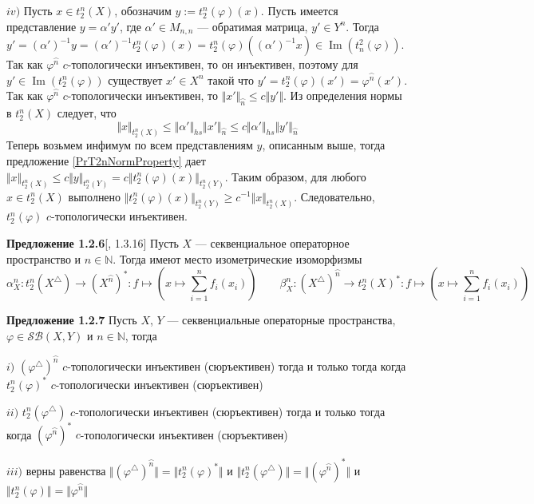 \documentclass[12pt]{article}
\begin{document}
$iv)$ Пусть $x\in t_2^n(X)$, обозначим $y:=t_2^n(\varphi)(x)$. Пусть имеется представление $y=\alpha' y'$, где $\alpha'\in M_{n,n}$ --- обратимая матрица, $y'\in Y^n$. Тогда 
$y'=(\alpha')^{-1}y=(\alpha')^{-1}t_2^n(\varphi)(x)=t_2^n(\varphi)((\alpha')^{-1}x)\in\operatorname{Im}(t_n^2(\varphi))
$. Так как $\varphi^{\wideparen{n}}$ $c$-топологически инъективен, то он инъективен, поэтому для $y'\in \operatorname{Im}(t_2^n(\varphi))$ существует $x'\in X^n$ такой что 
$y'=t_2^n(\varphi)(x')=\varphi^{\wideparen{n}}(x')$. Так как $\varphi^{\wideparen{n}}$ $c$-топологически инъективен, то $\Vert x'\Vert_{\wideparen{n}}\leq c\Vert y'\Vert$. Из определения нормы в $t_2^n(X)$ следует, что
$$
\Vert x\Vert_{t_2^n(X)}\leq\Vert\alpha'\Vert_{hs}\Vert x'\Vert_{\wideparen{n}}\leq c\Vert\alpha'\Vert_{hs}\Vert y'\Vert_{\wideparen{n}}
$$
Теперь возьмем инфимум по всем представлениям $y$, описанным выше, тогда предложение \ref{PrT2nNormProperty} дает $\Vert x\Vert_{t_2^n(X)}\leq c\Vert y\Vert_{t_2^n(Y)}=c\Vert t_2^n(\varphi)(x)\Vert_{t_2^n(Y)}$. 
Таким образом, для любого $x\in t_2^n(X)$ выполнено $\Vert t_2^n(\varphi)(x)\Vert_{t_2^n(Y)}\geq c^{-1}\Vert x\Vert_{t_2^n(X)}$. Следовательно, $t_2^n(\varphi)$ $c$-топологически инъективен.

\medskip

{\bf Предложение 1.2.6}[\cite{LamOpFolgen}, 1.3.16]\label{PrT2nTraingDuality}
Пусть $X$ --- секвенциальное операторное пространство и $n\in\mathbb{N}$. Тогда имеют место изометрические изоморфизмы
$$
\alpha_X^n:t_2^n(X^\triangle)\to (X^{\wideparen{n}})^*: f\mapsto\left(x\mapsto\sum\limits_{i=1}^n f_i(x_i)\right)
\qquad
\beta_X^n:(X^\triangle)^{\wideparen{n}}\to t_2^n(X)^*:f\mapsto\left(x\mapsto\sum\limits_{i=1}^n f_i(x_i)\right)
$$

\medskip

{\bf Предложение 1.2.7}\label{PrTwoTypesDualOpEquiv}
Пусть $X$, $Y$ --- секвенциальные операторные пространства, $\varphi\in \mathcal{SB}(X,Y)$ и $n\in\mathbb{N}$, тогда 

$i)$ $(\varphi^\triangle)^{\wideparen{n}}$ $c$-топологически инъективен (сюръективен) тогда и только тогда когда $t_2^n(\varphi)^*$ $c$-топологически инъективен (сюръективен)

$ii)$ $t_2^n(\varphi^\triangle)$ $c$-топологически инъективен (сюръективен) тогда и только тогда когда $(\varphi^{\wideparen{n}})^*$ $c$-топологически инъективен (сюръективен)

$iii)$ верны равенства $\Vert (\varphi^\triangle)^{\wideparen{n}}\Vert=\Vert t_2^n(\varphi)^*\Vert$ и $\Vert t_2^n(\varphi^\triangle)\Vert=\Vert (\varphi^{\wideparen{n}})^*\Vert$ и  $\Vert t_2^n(\varphi)\Vert=\Vert\varphi^{\wideparen{n}}\Vert$
\end{document}
